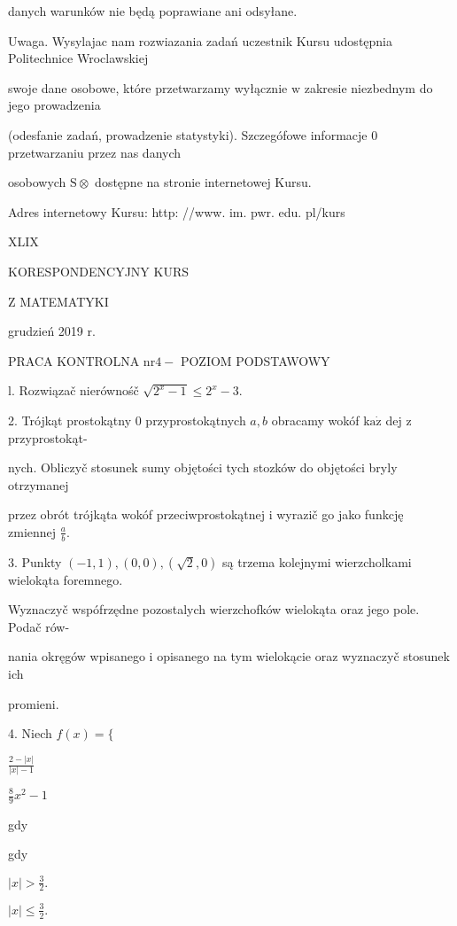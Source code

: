 \documentclass[a4paper,12pt]{article}
\begin{document}
danych warunków nie będą poprawiane ani odsyłane.

Uwaga. Wysylajac nam rozwiazania zadań uczestnik Kursu udostępnia Politechnice Wroclawskiej

swoje dane osobowe, które przetwarzamy wyłącznie $\mathrm{w}$ zakresie niezbednym do jego prowadzenia

(odesfanie zadań, prowadzenie statystyki). Szczegófowe informacje $0$ przetwarzaniu przez nas danych

osobowych $\mathrm{S}\otimes$ dostępne na stronie internetowej Kursu.

Adres internetowy Kursu: http: //www. im. pwr. edu. pl/kurs







XLIX

KORESPONDENCYJNY KURS

Z MATEMATYKI

grudzień 2019 r.

PRACA KONTROLNA $\mathrm{n}\mathrm{r} 4-$ POZIOM PODSTAWOWY

l. Rozwiązač nierównośč $\sqrt{2^{x}-1}\leq 2^{x}-3.$

2. Trójkąt prostokątny $0$ przyprostokątnych $a, b$ obracamy wokóf $\mathrm{k}\mathrm{a}\dot{\mathrm{z}}$ dej $\mathrm{z}$ przyprostokąt-

nych. Obliczyč stosunek sumy objętości tych stozków do objętości bryly otrzymanej

przez obrót trójkąta wokóf przeciwprostokątnej $\mathrm{i}$ wyrazič go jako funkcję zmiennej $\displaystyle \frac{a}{b}.$

3. Punkty $(-1,1), (0,0), (\sqrt{2},0)$ są trzema kolejnymi wierzcholkami wielokąta foremnego.

Wyznaczyč wspófrzędne pozostalych wierzchofków wielokąta oraz jego pole. Podač rów-

nania okręgów wpisanego $\mathrm{i}$ opisanego na tym wielokącie oraz wyznaczyč stosunek ich

promieni.

4. Niech $f(x)=\{$

$\displaystyle \frac{2-|x|}{|x|-1}$

$\displaystyle \frac{8}{9}x^{2}-1$

gdy

gdy

$|x|>\displaystyle \frac{3}{2}.$

$|x|\displaystyle \leq\frac{3}{2}.$
\end{document}

